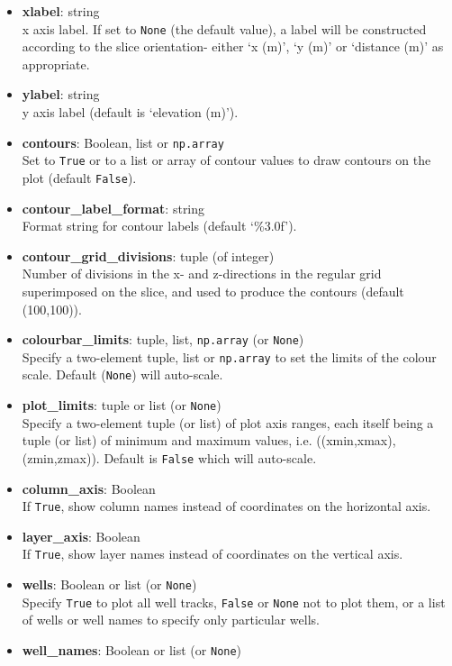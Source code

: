 \begin{itemize}
\item \textbf{xlabel}: string\\
  x axis label.  If set to \texttt{None} (the default value), a label will be constructed according to the slice orientation- either `x (m)', `y (m)' or `distance (m)' as appropriate.
\item \textbf{ylabel}: string\\
  y axis label (default is `elevation (m)').
\item \textbf{contours}: Boolean, list or \texttt{np.array}\\
  Set to \texttt{True} or to a list or array of contour values to draw contours on the plot (default \texttt{False}).
\item \textbf{contour\_label\_format}: string\\
  Format string for contour labels (default `\%3.0f').
\item \textbf{contour\_grid\_divisions}: tuple (of integer)\\
  Number of divisions in the x- and z-directions in the regular grid superimposed on the slice, and used to produce the contours (default (100,100)).
\item \textbf{colourbar\_limits}: tuple, list, \texttt{np.array} (or \texttt{None})\\
  Specify a two-element tuple, list or \texttt{np.array} to set the limits of the colour scale.  Default (\texttt{None}) will auto-scale.
\item \textbf{plot\_limits}: tuple or list (or \texttt{None})\\
  Specify a two-element tuple (or list) of plot axis ranges, each itself being a tuple (or list) of minimum and maximum values, i.e. ((xmin,xmax),(zmin,zmax)).  Default is \texttt{False} which will auto-scale.
\item \textbf{column\_axis}: Boolean\\
  If \texttt{True}, show column names instead of coordinates on the horizontal axis.
\item \textbf{layer\_axis}: Boolean\\
  If \texttt{True}, show layer names instead of coordinates on the vertical axis.
\item \textbf{wells}: Boolean or list (or \texttt{None})\\
  Specify \texttt{True} to plot all well tracks, \texttt{False} or \texttt{None} not to plot them, or a list of wells or well names to specify only particular wells.
\item \textbf{well\_names}: Boolean or list (or \texttt{None})\\

\end{itemize}
